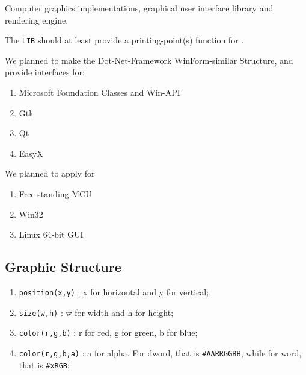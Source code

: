 
Computer graphics implementations, graphical user interface library and rendering engine.

The \verb`LIB` should at least provide a printing-point(s) function for .

We planned to make the Dot-Net-Framework WinForm-similar Structure, and provide interfaces for:

\begin{enumerate}
	\item Microsoft Foundation Classes and Win-API
	\item Gtk
	\item Qt
	\item EasyX
\end{enumerate}

We planned to apply for

\begin{enumerate}
	\item Free-standing MCU
	\item Win32
	\item Linux 64-bit GUI
\end{enumerate}

\subsection{Graphic Structure}

\begin{enumerate}
	\item \verb`position(x,y)`  : x for horizontal and y for vertical;
	\item \verb`size(w,h)`      : w for width and h for height;
	\item \verb`color(r,g,b)`   : r for red, g for green, b for blue;
	\item \verb`color(r,g,b,a)` : a for alpha. For dword, that is \verb`#AARRGGBB`, while for word, that is \verb|#xRGB|;	
\end{enumerate}

